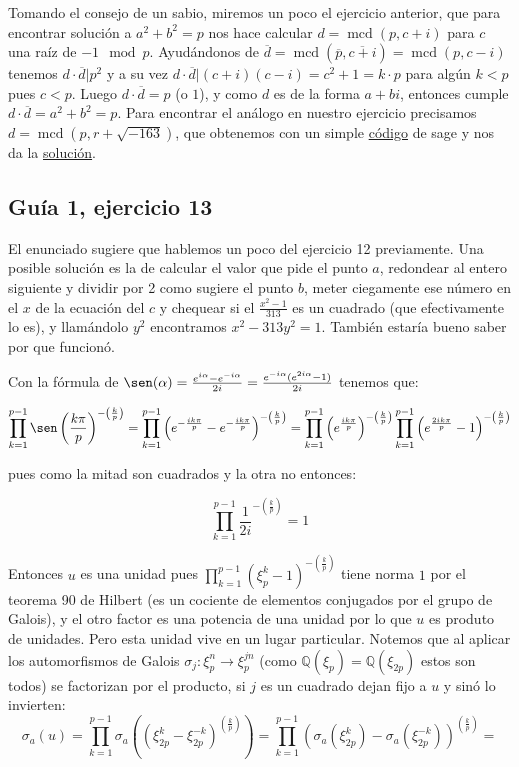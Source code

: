 \documentclass[12pt]{amsart}
\DeclareMathOperator{\mcd}{mcd}
\newcommand{\QQ}{\mathbb{Q}}
\newcommand{\lp}{\left(}
\newcommand{\rp}{\right)}
\theoremstyle{plain}
\begin{document}
Tomando el consejo de un sabio, miremos un poco el ejercicio anterior, 
que para encontrar solución a $a^2 +b^2 = p$ nos hace calcular
$d=\mcd(p,c+i)$ para $c$ una raíz de $-1\mod p$. Ayudándonos de
$\overline{d} = \mcd\lp\overline{p},\overline{c+i}\rp = \mcd\lp p,c-i\rp$ 
tenemos $d\cdot \overline{d} |p^2$ y a su vez 
$d\cdot \overline{d} |(c+i)(c-i)=c^2+1 = k\cdot p$ para algún 
$k<p$ pues $c<p$. Luego $d\cdot \overline{d} = p$ (o $1$), y como
$d$ es de la forma $a+bi$, entonces cumple $d\cdot \overline{d}=a^2+b^2 = p$.
Para encontrar el análogo en nuestro ejercicio precisamos 
$d=\mcd \lp p,r+\sqrt{-163} \rp$, que obtenemos con un simple 
\hyperref[codigo2]{código} de sage y nos da la 
\hyperref[solucion2]{solución}.

\subsection*{Guía 1, ejercicio 13}

El enunciado sugiere que hablemos un poco del ejercicio 12 
previamente. Una posible solución es la de calcular el valor 
que pide el punto $a$, redondear al entero siguiente y dividir 
por 2 como sugiere el punto $b$, meter ciegamente ese número en 
el $x$ de la ecuación del $c$ y chequear si el $\frac{x^2-1}
{313}$ es un cuadrado (que efectivamente lo es), y llamándolo 
$y^2$ encontramos $x^2-313y^2=1$. También estaría bueno saber 
por que funcionó.

Con la fórmula de $\sen(\alpha) = \frac{e^{i\alpha}-
e^{-i\alpha}}{2i} = \frac{e^{-i\alpha}(e^{2i\alpha}-1
)}{2i}$ tenemos que:

$$\prod^{p-1}_{k=1} \sen\lp\frac{k\pi}{p}\rp
^{-\lp\frac{k}{p} \rp} = \prod^{p-1}_{k=1} \lp e^{-\frac
{ik\pi}{p}} - e^{-\frac{ik\pi}{p}}\rp^{-\lp
\frac{k}{p} \rp}= \prod^{p-1}_{k=1} \lp e^{\frac
{ik\pi}{p}}\rp^{-\lp \frac{k}{p} \rp} \prod^{p-1}_{k=1}
\lp e^{\frac{2ik\pi}{p}}-1\rp^{-\lp\frac{k}{p} \rp}$$

pues como la mitad son cuadrados y la otra no entonces:

$$\prod^{p-1}_{k=1} \frac{1}{2i} ^ {-\lp \frac{k}{p} \rp} = 1$$

Entonces $u$ es una unidad pues $\prod^{p-1}_{k=1} \lp 
\xi_p^k-1\rp^{-\lp\frac{k}{p} \rp}$ tiene norma $1$ por el 
teorema 90 de Hilbert (es un cociente de elementos conjugados
por el grupo de Galois), y el otro factor es una potencia de 
una unidad por lo que $u$ es produto de unidades. Pero esta
unidad vive en un lugar particular. Notemos que al aplicar los 
automorfismos de Galois $\sigma_j: \xi_{p}^n \to \xi_{p}^{jn}$
(como $\QQ(\xi_p) = \QQ(\xi_{2p})$ estos son todos)
se factorizan por el producto, si $j$ es un cuadrado dejan
fijo a $u$ y sinó lo invierten:
$$\sigma_a(u) = \prod_{k=1}^{p-1} \sigma_a \lp
(\xi_{2p}^k - \xi_{2p}^{-k})^{\lp\frac{k}{p}\rp}
\rp = \prod_{k=1}^{p-1} \lp\sigma_a \lp\xi_{2p}^k\rp
- \sigma_a \lp\xi_{2p}^{-k}\rp\rp^{\lp\frac{k}{p}\rp} = $$
\end{document}
